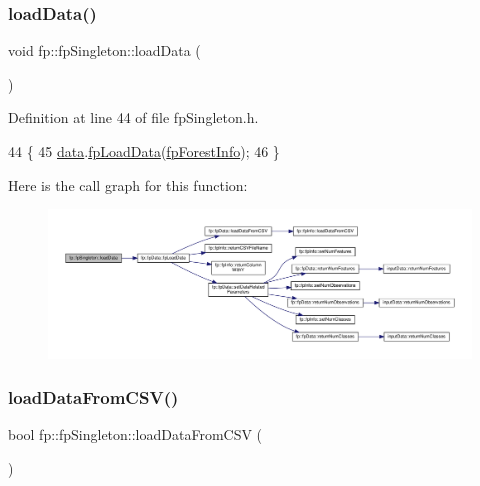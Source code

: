 \subsubsection{\texorpdfstring{load\+Data()}{loadData()}}
{\footnotesize\ttfamily void fp\+::fp\+Singleton\+::load\+Data (\begin{DoxyParamCaption}{ }\end{DoxyParamCaption})\hspace{0.3cm}{\ttfamily [inline]}}



Definition at line 44 of file fp\+Singleton.\+h.


\begin{DoxyCode}
44                                   \{
45                 \hyperlink{classfp_1_1fpSingleton_a2fa16ac6a0f66641749032eeee61b8e9}{data}.\hyperlink{classfp_1_1fpData_a91c727b1475eca340ca14c241b25c959}{fpLoadData}(\hyperlink{classfp_1_1fpSingleton_a85965009befa72a749ae498fa5b6ccfa}{fpForestInfo});
46             \}
\end{DoxyCode}
Here is the call graph for this function\+:\nopagebreak
\begin{figure}[H]
\begin{center}
\leavevmode
\includegraphics[width=350pt]{classfp_1_1fpSingleton_a86042ae6be6f59dfb90232678350011a_cgraph}
\end{center}
\end{figure}
\mbox{\label{classfp_1_1fpSingleton_a12178de58f19494062efe5255d937171}} 
\subsubsection{\texorpdfstring{load\+Data\+From\+C\+S\+V()}{loadDataFromCSV()}}
{\footnotesize\ttfamily bool fp\+::fp\+Singleton\+::load\+Data\+From\+C\+SV (\begin{DoxyParamCaption}{ }\end{DoxyParamCaption})\hspace{0.3cm}{\ttfamily [inline]}}



